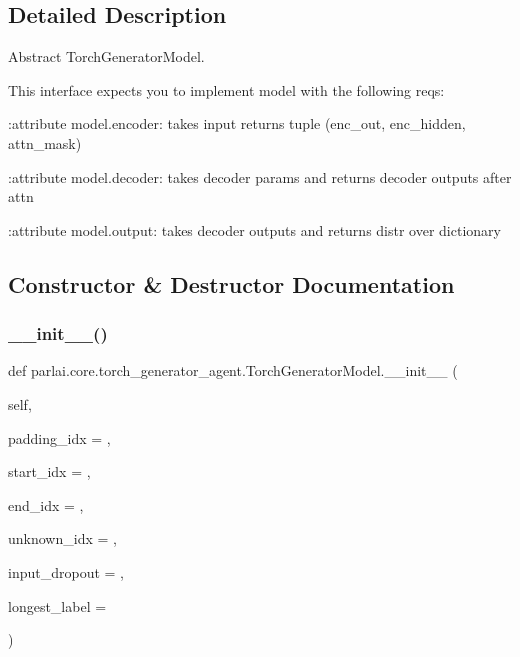 \subsection{Detailed Description}
\begin{DoxyVerb}Abstract TorchGeneratorModel.

This interface expects you to implement model with the following reqs:

:attribute model.encoder:
    takes input returns tuple (enc_out, enc_hidden, attn_mask)

:attribute model.decoder:
    takes decoder params and returns decoder outputs after attn

:attribute model.output:
    takes decoder outputs and returns distr over dictionary
\end{DoxyVerb}
 

\subsection{Constructor \& Destructor Documentation}
\mbox{\label{classparlai_1_1core_1_1torch__generator__agent_1_1TorchGeneratorModel_aaec943d5add4e6d90fdd451f740be6af}} 
\subsubsection{\texorpdfstring{\+\_\+\+\_\+init\+\_\+\+\_\+()}{\_\_init\_\_()}}
{\footnotesize\ttfamily def parlai.\+core.\+torch\+\_\+generator\+\_\+agent.\+Torch\+Generator\+Model.\+\_\+\+\_\+init\+\_\+\+\_\+ (\begin{DoxyParamCaption}\item[{}]{self,  }\item[{}]{padding\+\_\+idx = {},  }\item[{}]{start\+\_\+idx = {},  }\item[{}]{end\+\_\+idx = {},  }\item[{}]{unknown\+\_\+idx = {},  }\item[{}]{input\+\_\+dropout = {},  }\item[{}]{longest\+\_\+label = {} }\end{DoxyParamCaption})}




